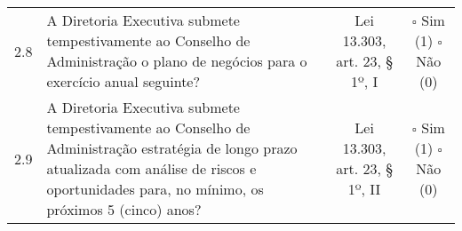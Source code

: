 \begin{center}
\begin{longtable}{c l c c}
2.8 &\parbox[t]{8cm}{A Diretoria Executiva submete tempestivamente ao Conselho de Administração o plano de negócios para o exercício anual seguinte?} & \parbox[t]{2cm}{Lei 13.303, art. 23, § 1º, I} & \parbox[t]{2cm}{$\square$ Sim (1) \\ $\square$ Não (0)}\\
2.9 &\parbox[t]{8cm}{A Diretoria Executiva submete tempestivamente ao Conselho de Administração estratégia de longo prazo atualizada com análise de riscos e oportunidades para, no mínimo, os próximos 5 (cinco) anos?} & \parbox[t]{2cm}{Lei 13.303, art. 23, § 1º, II} & \parbox[t]{2cm}{$\square$ Sim (1) \\ $\square$ Não (0)}\\
\end{longtable}
\end{center}
\pagebreak

